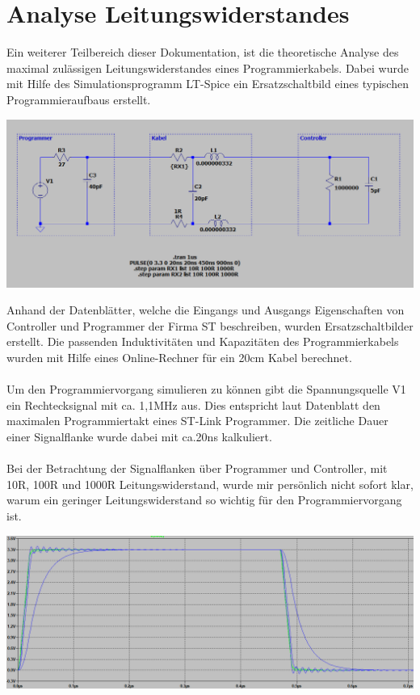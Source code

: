 \section{Analyse Leitungswiderstandes}

Ein weiterer Teilbereich dieser Dokumentation, ist die theoretische Analyse des maximal zulässigen Leitungswiderstandes eines Programmierkabels. Dabei wurde mit Hilfe des Simulationsprogramm \glqq LT-Spice\grqq{} ein Ersatzschaltbild eines typischen Programmieraufbaus erstellt.\\

\begin{center}
\includegraphics[width=17cm]{Bilder/LTC-SCHALTBILD.png}
\end{center}

Anhand der Datenblätter, welche die Eingangs und Ausgangs Eigenschaften von Controller und Programmer der Firma ST beschreiben, wurden Ersatzschaltbilder erstellt. Die passenden Induktivitäten und Kapazitäten des Programmierkabels wurden mit Hilfe eines Online-Rechner für ein 20cm Kabel berechnet.
\\
\\
Um den Programmiervorgang simulieren zu können gibt die Spannungsquelle V1 ein Rechtecksignal mit ca. 1,1MHz aus. Dies entspricht laut Datenblatt den maximalen Programmiertakt eines ST-Link Programmer. Die zeitliche Dauer einer Signalflanke wurde dabei mit ca.20ns kalkuliert.
\\
\\
Bei der Betrachtung der Signalflanken über Programmer und Controller, mit 10R, 100R und 1000R Leitungswiderstand, wurde mir persönlich nicht sofort klar, warum ein geringer Leitungswiderstand so wichtig für den Programmiervorgang ist. 

\begin{center}
\includegraphics[width=17cm]{Bilder/LTC-SIGNALVERLAUF1.png}
\end{center}

